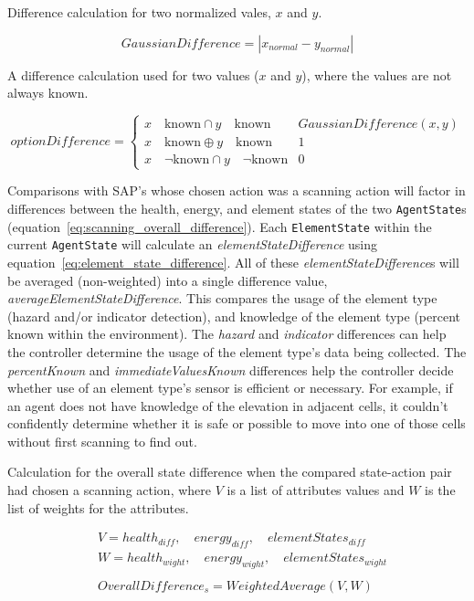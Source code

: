\caption{Difference calculation for two normalized vales, $x$ and $y$.}
\begin{equation} \label{eq:gaussian_difference}
  GaussianDifference = |x_{normal} - y_{normal}|
\end{equation}

\caption{A difference calculation used for two values ($x$ and $y$), where the values are not always known.}
\begin{equation} \label{eq:option_difference}
  optionDifference =
  \begin{cases}
    x \quad \text{known} \cap y \quad \text{known} & GaussianDifference(x,y) \\
    x \quad \text{known} \oplus y \quad \text{known} & 1 \\
    x \quad \neg \text{known} \cap y \quad \neg \text{known} & 0
  \end{cases}
\end{equation}

Comparisons with SAP's whose chosen action was a scanning action will factor in differences between the health, energy, and element states of the two \texttt{AgentState}s (equation~\ref{eq:scanning_overall_difference}).
Each \texttt{ElementState} within the current \texttt{AgentState} will calculate an \textit{elementStateDifference} using equation~\ref{eq:element_state_difference}.
All of these \textit{elementStateDifference}s will be averaged (non-weighted) into a single difference value, \textit{averageElementStateDifference}.
This compares the usage of the element type (hazard and/or indicator detection), and knowledge of the element type (percent known within the environment).
The \textit{hazard} and \textit{indicator} differences can help the controller determine the usage of the element type's data being collected.
The \textit{percentKnown} and \textit{immediateValuesKnown} differences help the controller decide whether use of an element type's sensor is efficient or necessary.
For example, if an agent does not have knowledge of the elevation in adjacent cells, it couldn't confidently determine whether it is safe or possible to move into one of those cells without first scanning to find out.

\caption{Calculation for the overall state difference when the compared state-action pair had chosen a scanning action, where $V$ is a list of attributes values and $W$ is the list of weights for the attributes.}
\begin{equation} \label{eq:scanning_overall_difference}
\begin{align}
  &V = {health_{diff},\quad energy_{diff},\quad elementStates_{diff}} \\
  &W = {health_{wight},\quad energy_{wight},\quad elementStates_{wight}} \\
  &\\
  &OverallDifference_{s} = WeightedAverage(V,W)
\end{align}
\end{equation}

